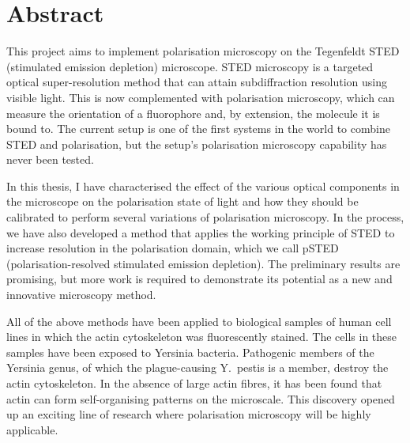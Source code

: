 \chapter{Abstract}

This project aims to implement polarisation microscopy on the Tegenfeldt STED (stimulated emission depletion) microscope. STED microscopy is a targeted optical super-resolution method that can attain subdiffraction resolution using visible light. This is now complemented with polarisation microscopy, which can measure the orientation of a fluorophore and, by extension, the molecule it is bound to. The current setup is one of the first systems in the world to combine STED and polarisation, but the setup's polarisation microscopy capability has never been tested.

In this thesis, I have characterised the effect of the various optical components in the microscope on the polarisation state of light and how they should be calibrated to perform several variations of polarisation microscopy. In the process, we have also developed a method that applies the working principle of STED to increase resolution in the polarisation domain, which we call pSTED (polarisation-resolved stimulated emission depletion). The preliminary results are promising, but more work is required to demonstrate its potential as a new and innovative microscopy method.

All of the above methods have been applied to biological samples of human cell lines in which the actin cytoskeleton was fluorescently stained. The cells in these samples have been exposed to Yersinia bacteria. Pathogenic members of the Yersinia genus, of which the plague-causing Y.~pestis is a member, destroy the actin cytoskeleton. In the absence of large actin fibres, it has been found that actin can form self-organising patterns on the microscale. This discovery opened up an exciting line of research where polarisation microscopy will be highly applicable.